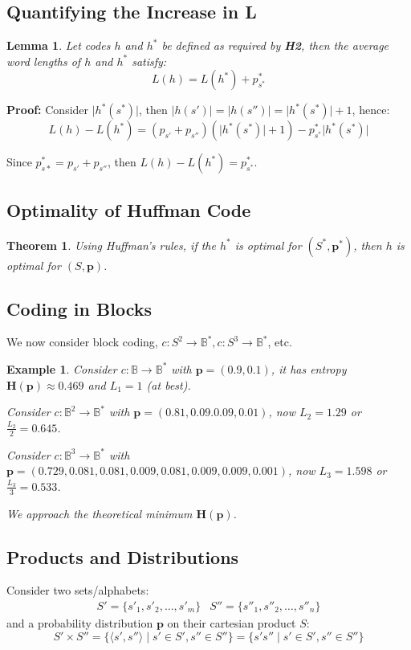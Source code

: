 \documentclass[11pt]{article}
\newtheorem{eg}{Example}
\newtheorem{theo}{Theorem}
\newtheorem{lem}{Lemma}
\begin{document}
\subsection{Quantifying the Increase in L}
\begin{lem}
  Let codes $h$ and $h^*$ be defined as required by \textbf{H2}, then the average word lengths of $h$ and $h^*$ satisfy:
  \[
    L(h) = L(h^*) + p_{s^*}^*
  \]
\end{lem}

\textbf{Proof:}
Consider $\lvert h^*(s^*) \rvert$, then $\lvert h(s') \rvert = \lvert h(s'') \rvert = \lvert h^*(s^*) \rvert + 1$, hence:
\[
  L(h) - L(h^*) = (p_{s'} + p_{s''})(\lvert h^*(s^*) \rvert + 1) - p_{s^*}^* \lvert h^*(s^*) \rvert
\]

Since $p_{s*}^* = p_{s'} + p_{s''}$, then $L(h) - L(h^*) = p_{s^*}^*$.

\subsection{Optimality of Huffman Code}
\begin{theo}
  Using Huffman's rules, if the $h^*$ is optimal for $(S^*, \textbf{p}^*)$, then $h$ is optimal for $(S, \textbf{p})$.
\end{theo}

\subsection{Coding in Blocks}
We now consider block coding, $c : S^2 \rightarrow \mathbb{B}^*, c : S^3 \rightarrow \mathbb{B}^*$, etc.
\begin{eg}
  Consider $c: \mathbb{B} \rightarrow \mathbb{B}^*$ with $\textbf{p} = (0.9, 0.1)$, it has entropy $\textbf{H}(\textbf{p}) \approx 0.469$ and $L_1 = 1$ (at best).

  Consider $c: \mathbb{B}^2 \rightarrow \mathbb{B}^*$ with $\textbf{p} = (0.81, 0.09. 0.09, 0.01)$, now $L_2 = 1.29$ or $\frac{L_2}{2} = 0.645$.

  Consider $c: \mathbb{B}^3 \rightarrow \mathbb{B}^*$ with $\textbf{p} = (0.729, 0.081, 0.081, 0.009, 0.081, 0.009, 0.009, 0.001)$, now $L_3 = 1.598$ or $\frac{L_3}{3} = 0.533$.

  We approach the theoretical minimum $\textbf{H}(\textbf{p})$.
\end{eg}

\subsection{Products and Distributions}
Consider two sets/alphabets:
\begin{align*}
  S' = \{ s'_1, s'_2, \ldots, s'_m \} & S'' = \{ s''_1, s''_2, \ldots, s''_n \}
\end{align*}
and a probability distribution $\textbf{p}$ on their cartesian product $S$:
\[
  S' \times S'' = \{ \langle s', s'' \rangle \mid s' \in S', s'' \in S'' \} = \{ s's'' \mid s' \in S', s'' \in S'' \}
\]
\end{document}
